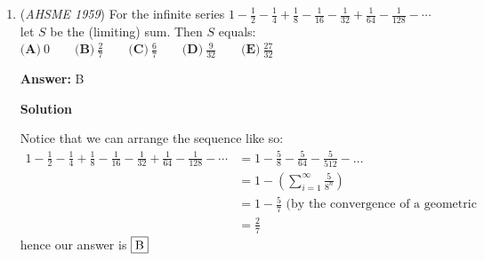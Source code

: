 \begin{enumerate}
 \textbf{Answer: }B



\textbf{Solution}

We perform \href{https://artofproblemsolving.com/wiki/index.php?title=Casework}{casework} by the value of $n$, the \href{https://artofproblemsolving.com/wiki/index.php?title=Degree}{degree} of our \href{https://artofproblemsolving.com/wiki/index.php?title=Polynomial}{polynomial} $a_0x^n+a_1x^{n-1}+\cdots+a_{n-1}x+a_n$.

 Case $n = 0$: In this case we are forced to set $a_0 = 3$. This contributes $1$ possibility.

 Case $n = 1$: In this case we must have $a_0 + |a_1| = 2$, so our polynomial could be $1 + 1x, 0 + 2x, -1 + 1x$. This contributes $3$ possibilities.

 Case $n = 2$: In this case we must have $a_0 + |a_1| + |a_2| = 1$. However, because $a_0$ must be positive, it has to be $1$, so our polynomial can only be $0 + 0x + 1x^2$. This contributes $1$ possibility.

 Case $n\geq 3$: This case is impossible because $h = n+a_0+|a_1|+|a_2|+\cdots+|a_n|\geq n + a_0\geq 3 + 1 = 4 > 3$, so it contributes $0$ possibilities.

 Adding the results from all four cases, we find that there are $1 + 3 + 1 + 0 = 5$ possibilities in total, so our answer is $\boxed{(B)}$.

 


	\item (\textit{AHSME 1959}) For the infinite series $1-\frac12-\frac14+\frac18-\frac{1}{16}-\frac{1}{32}+\frac{1}{64}-\frac{1}{128}-\cdots$ let $S$ be the (limiting) sum. Then $S$ equals:
$\textbf{(A)}\ 0\qquad\textbf{(B)}\ \frac27\qquad\textbf{(C)}\ \frac67\qquad\textbf{(D)}\ \frac{9}{32}\qquad\textbf{(E)}\ \frac{27}{32}$

 \textbf{Answer: }B



\textbf{Solution}

Notice that we can arrange the sequence like so: 
 \begin{align*}1-\frac12-\frac14+\frac18-\frac{1}{16}-\frac{1}{32}+\frac{1}{64}-\frac{1}{128}-\cdots  &= 1-\frac{5}{8}-\frac{5}{64}-\frac{5}{512}-\dots \\ &= 1-\left(\sum_{i=1}^{\infty}\frac{5}{8^n}\right) \\ &= 1-\frac{5}{7} \text{ (by the convergence of a geometric series)} \\ &=\frac{2}{7}\end{align*}
hence our answer is $\fbox{B}$




\end{enumerate}
